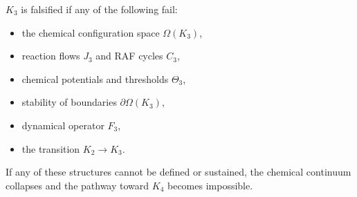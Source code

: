 $K_3$ is falsified if any of the following fail:

\begin{itemize}
    \item the chemical configuration space $\Omega(K_3)$,
    \item reaction flows $J_3$ and RAF cycles $C_3$,
    \item chemical potentials and thresholds $\Theta_3$,
    \item stability of boundaries $\partial\Omega(K_3)$,
    \item dynamical operator $F_3$,
    \item the transition $K_2\to K_3$.
\end{itemize}

If any of these structures cannot be defined or sustained, the chemical
continuum collapses and the pathway toward $K_4$ becomes impossible.
